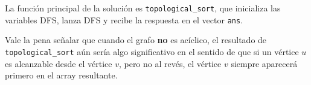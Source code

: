 La función principal de la solución es \texttt{topological\_sort}, que inicializa las variables DFS, lanza DFS y recibe la respuesta en el vector \texttt{ans}. 

Vale la pena señalar que cuando el grafo \textbf{no} es acíclico, el resultado de \texttt{topological\_sort} aún sería algo significativo en el sentido de que si un vértice $u$ es alcanzable desde el vértice $v$, pero no al revés, el vértice $v$ siempre aparecerá primero en el array resultante.

